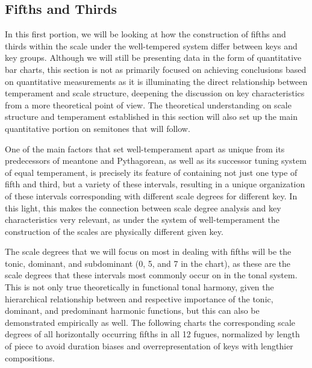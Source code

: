     \subsection{Fifths and Thirds}\label{fifths-and-thirds}

    In this first portion, we will be looking at how the construction of
fifths and thirds within the scale under the well-tempered system differ
between keys and key groups. Although we will still be presenting data
in the form of quantitative bar charts, this section is not as primarily
focused on achieving conclusions based on quantitative measurements as
it is illuminating the direct relationship between temperament and scale
structure, deepening the discussion on key characteristics from a more
theoretical point of view. The theoretical understanding on scale
structure and temperament established in this section will also set up
the main quantitative portion on semitones that will follow.

One of the main factors that set well-temperament apart as unique from
its predecessors of meantone and Pythagorean, as well as its successor
tuning system of equal temperament, is precisely its feature of
containing not just one type of fifth and third, but a variety of these
intervals, resulting in a unique organization of these intervals
corresponding with different scale degrees for different key. In this
light, this makes the connection between scale degree analysis and key
characteristics very relevant, as under the system of well-temperament
the construction of the scales are physically different given key.

The scale degrees that we will focus on most in dealing with fifths will
be the tonic, dominant, and subdominant (0, 5, and 7 in the chart), as
these are the scale degrees that these intervals most commonly occur on
in the tonal system. This is not only true theoretically in functional
tonal harmony, given the hierarchical relationship between and
respective importance of the tonic, dominant, and predominant harmonic
functions, but this can also be demonstrated empirically as well. The
following charts the corresponding scale degrees of all horizontally
occurring fifths in all 12 fugues, normalized by length of piece to
avoid duration biases and overrepresentation of keys with lengthier
compositions.



    \begin{center}
    \end{center}
    
